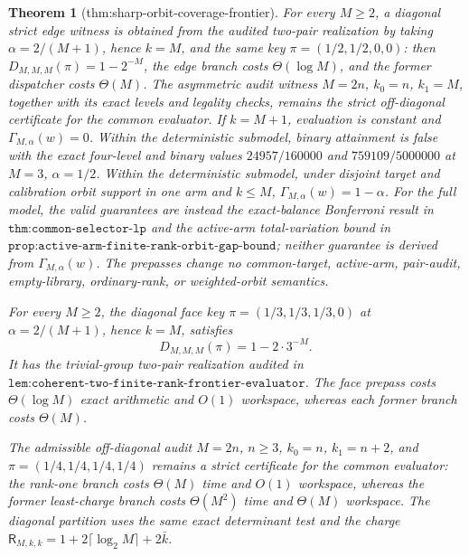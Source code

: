 \documentclass{article}
\newtheorem{theorem}{Theorem}
\begin{document}
\begin{theorem}[thm:sharp-orbit-coverage-frontier]
For every \(M\ge2\), a diagonal strict edge witness is obtained from the audited two-pair realization by taking \(\alpha=2/(M+1)\), hence \(k=M\), and the same key \(\pi=(1/2,1/2,0,0)\): then \(D_{M,M,M}(\pi)=1-2^{-M}\), the edge branch costs \(\Theta(\log M)\), and the former dispatcher costs \(\Theta(M)\). The asymmetric audit witness \(M=2n\), \(k_0=n\), \(k_1=M\), together with its exact levels and legality checks, remains the strict off-diagonal certificate for the common evaluator. If \(k=M+1\), evaluation is constant and \(\Gamma_{M,\alpha}(w)=0\). Within the deterministic submodel, binary attainment is false with the exact four-level and binary values \(24957/160000\) and \(759109/5000000\) at \(M=3\), \(\alpha=1/2\). Within the deterministic submodel, under disjoint target and calibration orbit support in one arm and \(k\le M\), \(\Gamma_{M,\alpha}(w)=1-\alpha\). For the full model, the valid guarantees are instead the exact-balance Bonferroni result in \(\texttt{thm:common-selector-lp}\) and the active-arm total-variation bound in \(\texttt{prop:active-arm-finite-rank-orbit-gap-bound}\); neither guarantee is derived from \(\Gamma_{M,\alpha}(w)\). The prepasses change no common-target, active-arm, pair-audit, empty-library, ordinary-rank, or weighted-orbit semantics.

For every \(M\ge2\), the diagonal face key \(\pi=(1/3,1/3,1/3,0)\) at \(\alpha=2/(M+1)\), hence \(k=M\), satisfies
\[
D_{M,M,M}(\pi)=1-2\cdot3^{-M}.
\]
It has the trivial-group two-pair realization audited in \(\texttt{lem:coherent-two-finite-rank-frontier-evaluator}\). The face prepass costs \(\Theta(\log M)\) exact arithmetic and \(O(1)\) workspace, whereas each former branch costs \(\Theta(M)\).

The admissible off-diagonal audit \(M=2n\), \(n\ge3\), \(k_0=n\), \(k_1=n+2\), and \(\pi=(1/4,1/4,1/4,1/4)\) remains a strict certificate for the common evaluator: the rank-one branch costs \(\Theta(M)\) time and \(O(1)\) workspace, whereas the former least-charge branch costs \(\Theta(M^2)\) time and \(\Theta(M)\) workspace. The diagonal partition uses the same exact determinant test and the charge \(\mathsf R_{M,k,k}=1+2\lceil\log_2M\rceil+2\bar k\).
\end{theorem}
\end{document}

